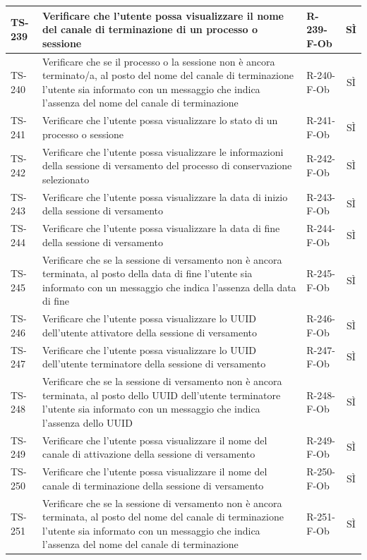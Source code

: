 \documentclass[a4paper,12pt]{article}
\begin{document}
\begin{longtable}{|p{1.5cm}|p{8.3cm}|p{2.4cm}|c|}
\hline
TS-239 & Verificare che l'utente possa visualizzare il nome del canale di terminazione di un processo o sessione & R-239-F-Ob & SÌ \\
\hline
TS-240 & Verificare che se il processo o la sessione non è ancora terminato/a, al posto del nome del canale di terminazione l'utente sia informato con un messaggio che indica l'assenza del nome del canale di terminazione & R-240-F-Ob & SÌ \\
\hline
TS-241 & Verificare che l'utente possa visualizzare lo stato di un processo o sessione & R-241-F-Ob & SÌ \\
\hline
TS-242 & Verificare che l'utente possa visualizzare le informazioni della sessione di versamento del processo di conservazione selezionato & R-242-F-Ob & SÌ \\
\hline
TS-243 & Verificare che l'utente possa visualizzare la data di inizio della sessione di versamento & R-243-F-Ob & SÌ \\
\hline
TS-244 & Verificare che l'utente possa visualizzare la data di fine della sessione di versamento & R-244-F-Ob & SÌ \\
\hline
TS-245 & Verificare che se la sessione di versamento non è ancora terminata, al posto della data di fine l'utente sia informato con un messaggio che indica l'assenza della data di fine & R-245-F-Ob & SÌ \\
\hline
TS-246 & Verificare che l'utente possa visualizzare lo UUID dell'utente attivatore della sessione di versamento & R-246-F-Ob & SÌ \\
\hline
TS-247 & Verificare che l'utente possa visualizzare lo UUID dell'utente terminatore della sessione di versamento & R-247-F-Ob & SÌ \\
\hline
TS-248 & Verificare che se la sessione di versamento non è ancora terminata, al posto dello UUID dell'utente terminatore l'utente sia informato con un messaggio che indica l'assenza dello UUID & R-248-F-Ob & SÌ \\
\hline
TS-249 & Verificare che l'utente possa visualizzare il nome del canale di attivazione della sessione di versamento & R-249-F-Ob & SÌ \\
\hline
TS-250 & Verificare che l'utente possa visualizzare il nome del canale di terminazione della sessione di versamento & R-250-F-Ob & SÌ \\
\hline
TS-251 & Verificare che se la sessione di versamento non è ancora terminata, al posto del nome del canale di terminazione l'utente sia informato con un messaggio che indica l'assenza del nome del canale di terminazione & R-251-F-Ob & SÌ \\

\end{longtable}
\end{document}
